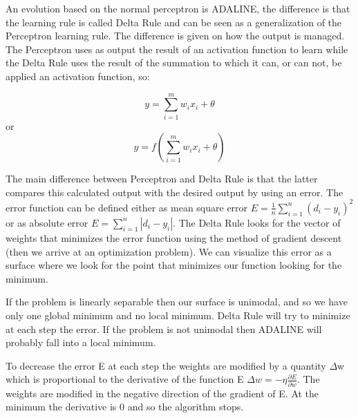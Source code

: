 An evolution based on the normal perceptron is ADALINE, the difference is that the learning rule is called Delta Rule and can be seen as a generalization of the Perceptron learning rule. The difference is given on how the output is managed. The Perceptron uses as output the result of an activation function to learn while the Delta Rule uses the result of the summation to which it can, or can not, be applied an activation function, so:

\[
y = \sum_{i=1}^{m}w_ix_i + \theta
\]
or
\[
y = f\left(\sum_{i=1}^{m}w_ix_i + \theta\right)
\]

The main difference between Perceptron and Delta Rule is that the latter compares this calculated output with the desired output by using an error. The error function can be defined either as mean square error $ E = \frac{1}{n}\sum_{i=1}^{n}
(d_i - y_i)^2$ or as absolute error $E = \sum_{i=1}^{n} |d_i -y_i|$. The Delta Rule looks for the vector of weights that minimizes the error function using the method of gradient descent (then we arrive at an optimization problem). We can visualize this error as a surface where we look for the point that minimizes our function looking for the minimum. 

\vspace{10pt}

If the problem is linearly separable then our surface is unimodal, and so we have only one global minimum and no local minimum. Delta Rule will try to minimize at each step the error. If the problem is not unimodal then ADALINE will probably fall into a local minimum. 

\vspace{10pt}

To decrease the error E at each step the weights are modified by a quantity $\Delta$w which is proportional to the derivative of the function E \ra  $\Delta w = - \eta \frac{\partial E}{\partial w}$. The weights are modified in the negative direction of the gradient of E. At the minimum the derivative is 0 and so the algorithm stops. 

